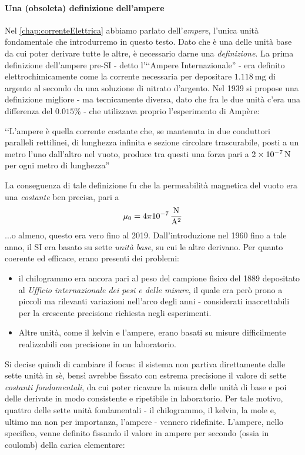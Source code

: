 \paragraph{Una (obsoleta) definizione dell'ampere}
Nel \autoref{chap:correnteElettrica} abbiamo parlato dell'\textit{ampere}, l'unica unità fondamentale che introdurremo in questo testo. Dato che è una delle unità base da cui poter derivare tutte le altre, è necessario darne una \textit{definizione}.
La prima definizione dell'ampere pre-SI - detto l'‘‘Ampere Internazionale'' - era definito elettrochimicamente come la corrente necessaria per depositare $\SI{1.118}{\milli\gram}$ di argento al secondo da una soluzione di nitrato d'argento. Nel 1939 si propose una definizione migliore - ma tecnicamente diversa, dato che fra le due unità c'era una differenza del $0.015\%$ - che utilizzava proprio l'esperimento di Ampère:
\begin{center}
	‘‘L'ampere è quella corrente costante che, se mantenuta in due conduttori  paralleli rettilinei, di lunghezza infinita e sezione circolare trascurabile, posti a un metro l'uno dall'altro nel vuoto, produce tra questi una forza pari a $\SI{2d-7}{\newton}$ per ogni metro di lunghezza''
\end{center}
La conseguenza di tale definizione fu che la permeabilità magnetica del vuoto era una \textit{costante} ben precisa, pari a
\begin{equation}
	\mu_0=4\pi \SI[per-mode = fraction]{d-7}{\newton\per\ampere\squared}
\end{equation}
...o almeno, questo era vero fino al 2019. Dall'introduzione nel 1960 fino a tale anno, il SI era basato su sette \textit{unità base}, su cui le altre derivano. Per quanto coerente ed efficace, erano presenti dei problemi:
\begin{itemize}
	\item il chilogrammo era ancora pari al peso del campione fisico del 1889 depositato al \textit{Ufficio internazionale dei pesi e delle misure}, il quale era però prono a piccoli ma rilevanti variazioni nell'arco degli anni - considerati inaccettabili per la crescente precisione richiesta negli esperimenti.
	\item Altre unità, come il kelvin e l'ampere, erano basati su misure difficilmente realizzabili con precisione in un laboratorio. 
\end{itemize}
Si decise quindi di cambiare il focus: il sistema non partiva direttamente dalle sette unità in sè, bensì avrebbe fissato con estrema precisione il valore di sette \textit{costanti fondamentali}, da cui poter ricavare la misura delle unità di base e poi delle derivate in modo consistente e ripetibile in laboratorio. Per tale motivo, quattro delle sette unità fondamentali - il chilogrammo, il kelvin, la mole e, ultimo ma non per importanza, l'ampere - vennero ridefinite. L'ampere, nello specifico, venne definito fissando il valore in ampere per secondo (ossia in coulomb) della carica elementare:
